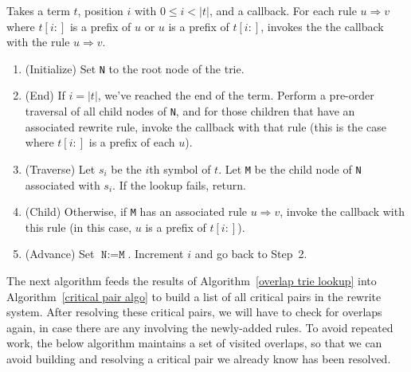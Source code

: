 \documentclass[../generics]{subfiles}
\begin{document}
\begin{algorithm}\label{overlap trie lookup}
Takes a term $t$, position $i$ with $0\leq i<|t|$, and a callback. For each rule $u\Rightarrow v$ where $t[i:]$ is a prefix of $u$ or $u$ is a prefix of $t[i:]$, invokes the the callback with the rule $u\Rightarrow v$.
\begin{enumerate}
\item (Initialize) Set \texttt{N} to the root node of the trie.
\item (End) If $i=|t|$, we've reached the end of the term. Perform a pre-order traversal of all child nodes of \texttt{N}, and for those children that have an associated rewrite rule, invoke the callback with that rule (this is the case where $t[i:]$ is a prefix of each $u$).
\item (Traverse) Let $s_i$ be the $i$th symbol of $t$. Let \texttt{M} be the child node of \texttt{N} associated with $s_i$. If the lookup fails, return.
\item (Child) Otherwise, if \texttt{M} has an associated rule $u\Rightarrow v$, invoke the callback with this rule (in this case, $u$ is a prefix of $t[i:]$).
\item (Advance) Set $\texttt{N}:=\texttt{M}$. Increment $i$ and go back to Step~2.
\end{enumerate}
\end{algorithm}

The next algorithm feeds the results of Algorithm~\ref{overlap trie lookup} into Algorithm~\ref{critical pair algo} to build a list of all critical pairs in the rewrite system. After resolving these critical pairs, we will have to check for overlaps again, in case there are any involving the newly-added rules. To avoid repeated work,  the below algorithm maintains a set of visited overlaps, so that we can avoid building and resolving a critical pair we already know has been resolved.
\end{document}
